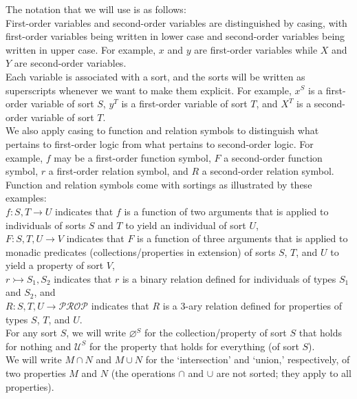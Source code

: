 \documentclass[12pt]{book}
\begin{document}
The notation that we will use is as follows:\\
\indent * First-order variables and second-order variables are distinguished by casing, with first-order variables being written in lower case and second-order variables being written in upper case. For example, $x$ and $y$ are first-order variables while $X$ and $Y$ are second-order variables.\\
\indent * Each variable is associated with a sort, and the sorts will be written as superscripts whenever we want to make them explicit. For example, $x^S$ is a first-order variable of sort $S$, $y^T$ is a first-order variable of sort $T$, and $X^T$ is a second-order variable of sort $T$.\\
\indent * We also apply casing to function and relation symbols to distinguish what pertains to first-order logic from what pertains to second-order logic. For example, $f$ may be a first-order function symbol, $F$ a second-order function symbol, $r$ a first-order relation symbol, and $R$ a second-order relation symbol.\\
\indent * Function and relation symbols come with sortings as illustrated by these examples:\\
\indent \indent $f : S, T \rightarrow U$ indicates that $f$ is a function of two arguments that is applied to individuals of sorts $S$ and $T$ to yield an individual of sort $U$,\\
\indent \indent $F : S, T, U \rightarrow V$ indicates that $F$ is a function of three arguments that is applied to monadic predicates (collections/properties in extension) of sorts $S$, $T$, and $U$ to yield a property of sort $V$,\\
\indent \indent $r \rightarrowtail S_1, S_2$ indicates that $r$ is a binary relation defined for individuals of types $S_1$ and $S_2$, and\\
\indent \indent $R : S, T, U \rightarrow \mathcal{PROP}$ indicates that $R$ is a 3-ary relation defined for properties of types $S$, $T$, and $U$.\\
\indent * For any sort $S$, we will write $\varnothing^S$ for the collection/property of sort $S$ that holds for nothing and $\mathcal{U}^S$ for the property that holds for everything (of sort $S$).\\
\indent * We will write $M \cap N$ and $M \cup N$ for the `intersection' and `union,' respectively, of two properties $M$ and $N$ (the operations $\cap$ and $\cup$ are not sorted; they apply to all properties).\\
\end{document}

